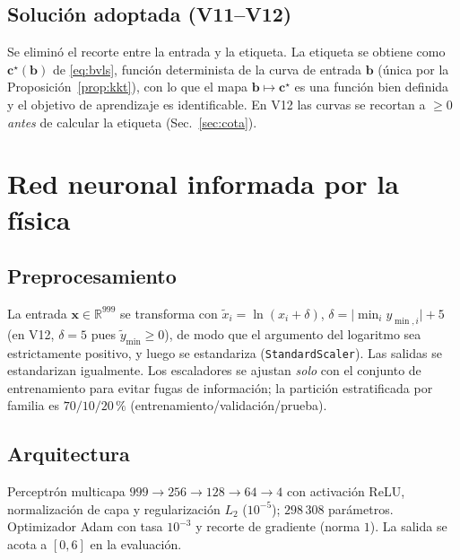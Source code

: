 \documentclass[11pt,twoside]{article}
\theoremstyle{definition}
\theoremstyle{remark}
\newcommand{\R}{\mathbb{R}}
\begin{document}
\subsection{Solución adoptada (V11--V12)}
Se eliminó el recorte entre la entrada y la etiqueta. La etiqueta se obtiene como $\bm c^\star(\bm b)$ de \eqref{eq:bvls}, función determinista de la curva de entrada $\bm b$ (única por la Proposición~\ref{prop:kkt}), con lo que el mapa $\bm b\mapsto\bm c^\star$ es una función bien definida y el objetivo de aprendizaje es identificable. En V12 las curvas se recortan a $\ge0$ \emph{antes} de calcular la etiqueta (Sec.~\ref{sec:cota}).

\section{Red neuronal informada por la física}\label{sec:pinn}
\subsection{Preprocesamiento}
La entrada $\bm x\in\R^{999}$ se transforma con $\tilde{x}_i=\ln(x_i+\delta)$, $\delta=\bigl|\min_i y_{\min,i}\bigr|+5$ (en V12, $\delta=5$ pues $\tilde y_{\min}\ge0$), de modo que el argumento del logaritmo sea estrictamente positivo, y luego se estandariza (\texttt{StandardScaler}). Las salidas se estandarizan igualmente. Los escaladores se ajustan \emph{solo} con el conjunto de entrenamiento para evitar fugas de información; la partición estratificada por familia es $70/10/20\,\%$ (entrenamiento/validación/prueba).

\subsection{Arquitectura}
Perceptrón multicapa $999\to256\to128\to64\to4$ con activación ReLU, normalización de capa \cite{Ba2016} y regularización $L_2$ ($10^{-5}$); $298{\,}308$ parámetros. Optimizador Adam \cite{Kingma2015} con tasa $10^{-3}$ y recorte de gradiente (norma $1$). La salida se acota a $[0,6]$ en la evaluación.
\end{document}
